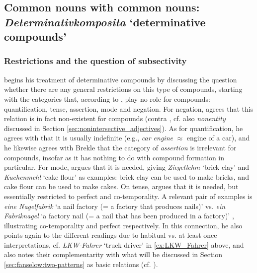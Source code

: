 \subsection[Determinative compounds]{Common nouns with common nouns: \emph{Determinativkomposita} `determinative compounds'}
\label{sec:fanselow-determinativ}

\subsubsection{Restrictions and the question of subsectivity}
\label{sec:fanselow_restrictions}

\citet[130]{Fanselow:1981} begins his treatment of determinative compounds by discussing the question whether there are any general
restrictions on this type of compounds, starting with the categories that,
according to \citet{Brekle:1970}, play no role for compounds: quantification,
tense, assertion, mode and negation. For negation, \citet{Fanselow:1981}
agrees that this relation is in fact non-existent for compounds (contra
\citealt{Downing:1977}, cf. also \emph{nonentity} discussed in Section \ref{sec:nonintersective_adjectives}). As for quantification, he agrees with
\citet{Brekle:1973} that it is usually indefinite (e.g., \emph{car engine}
$\approx$ engine of a car), and he likewise agrees with
Brekle that the category of \emph{assertion} is irrelevant for
compounds, insofar as it has nothing to do with compound formation in particular. For
mode, \citet[139]{Fanselow:1981} argues that it is needed, giving \emph{Ziegellehm} `brick clay' and
\emph{Kuchenmehl} `cake flour' as examples: brick clay can be used to make bricks, and cake flour can be used to make
cakes. On tense, \citet[133--139]{Fanselow:1981} argues that it is
needed, but essentially restricted to perfect and co-temporality. 
A relevant pair of examples is \emph{eine
    Nagelfabrik} `a nail factory (= a factory that produces nails)' %
vs. \emph{ein
    Fabriknagel} `a factory nail (= a nail that has been produced in a
  factory)'%
  , illustrating  co-temporality and perfect respectively.  In this
  connection, he also points again to the different readings due to habitual
  vs. at least once interpretations, cf. \emph{LKW-Fahrer} `truck driver' in \ref{ex:LKW_Fahrer} above,
  and also notes their complementarity with what will be discussed in Section \ref{sec:fanselow:two-patterns} as
  basic relations (cf. \citealt[138--139]{Fanselow:1981}). 

